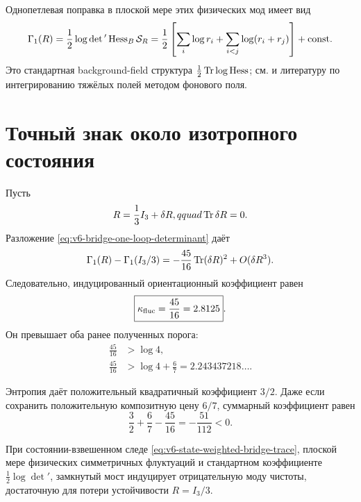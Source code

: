 Однопетлевая поправка в плоской мере этих физических мод имеет вид
\begin{equation}
 \Gamma_1(R)=\frac12\log\det{}'\operatorname{Hess}_B\mathcal S_R
 =\frac12\left[
 \sum_i\log r_i+\sum_{i<j}\log(r_i+r_j)
 \right]+\text{const}.
 \label{eq:v6-bridge-one-loop-determinant}
\end{equation}
Это стандартная background-field структура
$\frac12\operatorname{Tr}\log\operatorname{Hess}$; см.  и литературу по
интегрированию тяжёлых полей методом фонового поля.

\section{Точный знак около изотропного состояния}

Пусть
\begin{equation}
 R=\frac13I_3+\delta R,qquad\operatorname{Tr}\delta R=0.
\end{equation}
Разложение \eqref{eq:v6-bridge-one-loop-determinant} даёт
\begin{equation}
 \Gamma_1(R)-\Gamma_1(I_3/3)
 =-\frac{45}{16}\operatorname{Tr}(\delta R)^2+O(\delta R^3).
 \label{eq:v6-induced-negative-purity}
\end{equation}
Следовательно, индуцированный ориентационный коэффициент равен
\begin{equation}
 \boxed{\kappa_{\rm fluc}=\frac{45}{16}=2.8125}.
\end{equation}
Он превышает оба ранее полученных порога:
\begin{align}
 \frac{45}{16}&>\log4,\\
 \frac{45}{16}&>\log4+\frac67
 =2.243437218\ldots.
\end{align}

Энтропия даёт положительный квадратичный коэффициент $3/2$. Даже если
сохранить положительную композитную цену $6/7$, суммарный коэффициент
равен
\begin{equation}
 \frac32+\frac67-\frac{45}{16}
 =-\frac{51}{112}<0.
 \label{eq:v6-total-negative-purity-hessian}
\end{equation}

\begin{theorem}
При состоянии-взвешенном следе \eqref{eq:v6-state-weighted-bridge-trace},
плоской мере физических симметричных флуктуаций и стандартном коэффициенте
$\frac12\log\det{}'$, замкнутый мост индуцирует отрицательную моду чистоты,
достаточную для потери устойчивости $R=I_3/3$.
\end{theorem}


